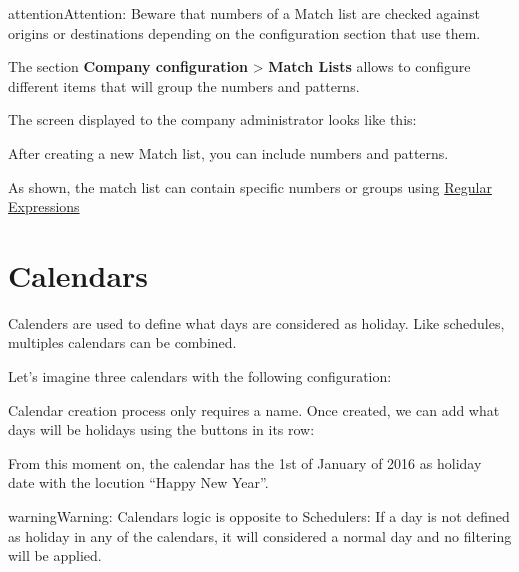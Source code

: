 \documentclass[letterpaper,10pt,english]{sphinxmanual}
\begin{document}
\begin{notice}{attention}{Attention:}
Beware that numbers of a Match list are checked against origins
or destinations depending on the configuration section that use them.
\end{notice}

The section \textbf{Company configuration} \textgreater{} \textbf{Match Lists} allows to configure
different items that will group the numbers and patterns.

The screen displayed to the company administrator looks like this:


After creating a new Match list, you can include numbers and patterns.


As shown, the match list can contain specific numbers or groups using
\href{http://php.net/manual/en/reference.pcre.pattern.syntax.php}{Regular Expressions}


\section{Calendars}
\label{company/calendars:calendars}\label{company/calendars::doc}
Calenders are used to define what days are considered as holiday. Like
schedules, multiples calendars can be combined.

Let's imagine three calendars with the following configuration:

\noindent{}

Calendar creation process only requires a name. Once created, we can add what
days will be holidays using the buttons in its row:

\noindent{}

From this moment on, the calendar has the 1st of January of 2016 as holiday
date with the locution ``Happy New Year''.

\begin{notice}{warning}{Warning:}
Calendars logic is opposite to Schedulers: If a day is not defined
as holiday in any of the calendars, it will considered a normal day and no
filtering will be applied.
\end{notice}
\end{document}
